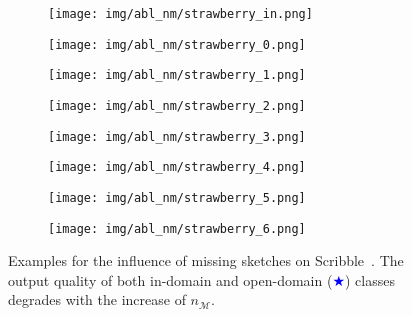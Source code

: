 \documentclass[10pt,twocolumn,letterpaper]{article}
\begin{document}
\begin{figure}[tbp]
\begin{center}
\begin{subfigure}[b]{\nmwidth\linewidth}
  \texttt{[image: img/abl\_nm/strawberry\_in.png]}
  \end{subfigure}
  \begin{subfigure}[b]{\nmwidth\linewidth}
  \texttt{[image: img/abl\_nm/strawberry\_0.png]}
  \end{subfigure}
\begin{subfigure}[b]{\nmwidth\linewidth}
  \texttt{[image: img/abl\_nm/strawberry\_1.png]}
  \end{subfigure}
  \begin{subfigure}[b]{\nmwidth\linewidth}
  \texttt{[image: img/abl\_nm/strawberry\_2.png]}
  \end{subfigure}
  \begin{subfigure}[b]{\nmwidth\linewidth}
  \texttt{[image: img/abl\_nm/strawberry\_3.png]}
  \end{subfigure}
  \begin{subfigure}[b]{\nmwidth\linewidth}
  \texttt{[image: img/abl\_nm/strawberry\_4.png]}
  \end{subfigure}
\begin{subfigure}[b]{\nmwidth\linewidth}
  \texttt{[image: img/abl\_nm/strawberry\_5.png]}
  \end{subfigure}
  \begin{subfigure}[b]{\nmwidth\linewidth}
  \texttt{[image: img/abl\_nm/strawberry\_6.png]}
  \end{subfigure}
\end{center}
\caption{Examples for the influence of missing sketches on Scribble~\cite{ghosh2019interactive}. The output quality of both in-domain and open-domain (\textcolor{blue}{$\bigstar$}) classes degrades with the increase of $n_{\mathcal{M}}$.}
 \label{fig:abl_missing}
\end{figure}
\end{document}
